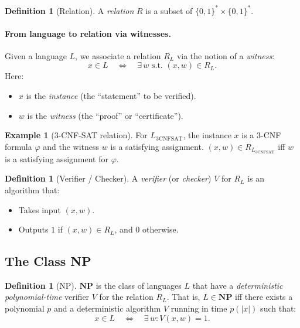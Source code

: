 \documentclass[11pt]{article}
\theoremstyle{plain}
\theoremstyle{definition}
\newtheorem{definition}[theorem]{Definition}
\newtheorem{example}[theorem]{Example}
\begin{document}
\begin{tcolorbox}[colback=blue!5!white, colframe=blue!50!black, title=Relations]
\begin{definition}[Relation]
A \emph{relation} $R$ is a subset of $\{0,1\}^* \times \{0,1\}^*$.
\end{definition}
\end{tcolorbox}

\paragraph{From language to relation via witnesses.}
Given a language $L$, we associate a relation $R_L$ via the notion of a \emph{witness}:
\[
  x \in L \quad \iff \quad \exists\, w \text{ s.t. } (x, w) \in R_L.
\]
Here:
\begin{itemize}
  \item $x$ is the \emph{instance} (the ``statement'' to be verified).
  \item $w$ is the \emph{witness} (the ``proof'' or ``certificate'').
\end{itemize}

\begin{example}[3-CNF-SAT relation]
For $L_{\mathrm{3CNFSAT}}$, the instance $x$ is a 3-CNF formula $\varphi$ and the witness
$w$ is a satisfying assignment.
$(x, w) \in R_{L_{\mathrm{3CNFSAT}}}$ iff $w$ is a satisfying assignment for $\varphi$.
\end{example}

\begin{definition}[Verifier / Checker]
A \emph{verifier} (or \emph{checker}) $V$ for $R_L$ is an algorithm that:
\begin{itemize}
  \item Takes input $(x, w)$.
  \item Outputs $1$ if $(x, w) \in R_L$, and $0$ otherwise.
\end{itemize}
\end{definition}

\subsection{The Class NP}

\begin{tcolorbox}[colback=orange!10!white, colframe=orange!60!black, title=Definition of NP]
\begin{definition}[NP]
$\mathbf{NP}$ is the class of languages $L$ that have a \emph{deterministic polynomial-time}
verifier $V$ for the relation $R_L$.
That is, $L \in \mathbf{NP}$ iff there exists a polynomial $p$ and a deterministic
algorithm $V$ running in time $p(|x|)$ such that:
\[
  x \in L \quad \iff \quad \exists\, w : V(x, w) = 1.
\]
\end{definition}
\end{tcolorbox}
\end{document}
